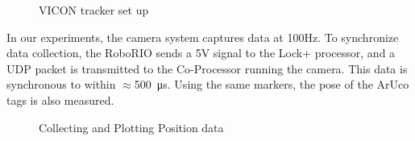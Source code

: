\documentclass{article}
\begin{document}
    \begin{figure}[H]%
        \centering
        \qquad
        \caption{VICON tracker set up}%
        \label{fig:viconSetup}%
    \end{figure}

    In our experiments, the camera system captures data at 100Hz. To synchronize data collection, the RoboRIO sends a 5V signal to the Lock+ processor, and a UDP packet is transmitted to the Co-Processor running the camera. This data is synchronous to within $\approx$\SI{500}{\micro\second}. Using the same markers, the pose of the ArUco tags is also measured.

    \begin{figure}[H]%
      \centering
      \qquad
      \caption{Collecting and Plotting Position data}%
      \label{fig:positionData}%
    \end{figure}
\end{document}
